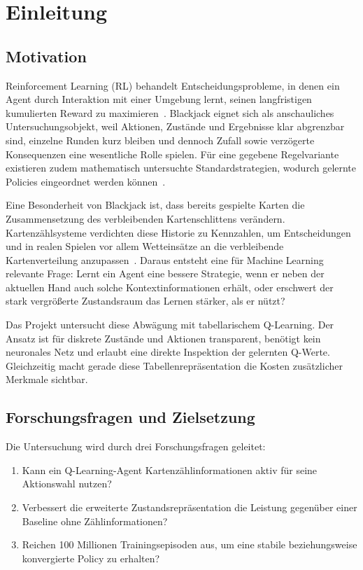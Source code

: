 \section{Einleitung}
\label{sec:einleitung}

\subsection{Motivation}

Reinforcement Learning (RL) behandelt Entscheidungsprobleme, in denen
ein Agent durch Interaktion mit einer Umgebung lernt, seinen
langfristigen kumulierten Reward zu
maximieren~\cite{sutton2018reinforcement}. Blackjack eignet sich als
anschauliches Untersuchungsobjekt, weil Aktionen, Zustände und
Ergebnisse klar abgrenzbar sind, einzelne Runden kurz bleiben und
dennoch Zufall sowie verzögerte Konsequenzen eine wesentliche Rolle
spielen. Für eine gegebene Regelvariante existieren zudem
mathematisch untersuchte Standardstrategien, wodurch gelernte
Policies eingeordnet werden können~\cite{baldwin1956blackjack}.

Eine Besonderheit von Blackjack ist, dass bereits gespielte Karten
die Zusammensetzung des verbleibenden Kartenschlittens verändern.
Kartenzählsysteme verdichten diese Historie zu Kennzahlen, um
Entscheidungen und in realen Spielen vor allem Wetteinsätze an die
verbleibende Kartenverteilung anzupassen~\cite{thorp1961favorable}.
Daraus entsteht eine für Machine Learning relevante Frage: Lernt ein
Agent eine bessere Strategie, wenn er neben der aktuellen Hand auch
solche Kontextinformationen erhält, oder erschwert der stark
vergrößerte Zustandsraum das Lernen stärker, als er nützt?

Das Projekt untersucht diese Abwägung mit tabellarischem Q-Learning.
Der Ansatz ist für diskrete Zustände und Aktionen transparent,
benötigt kein neuronales Netz und erlaubt eine direkte Inspektion der
gelernten Q-Werte. Gleichzeitig macht gerade diese
Tabellenrepräsentation die Kosten zusätzlicher Merkmale sichtbar.

\subsection{Forschungsfragen und Zielsetzung}

Die Untersuchung wird durch drei Forschungsfragen geleitet:

\begin{enumerate}
  \item Kann ein Q-Learning-Agent Kartenzählinformationen aktiv für
    seine Aktionswahl nutzen?
  \item Verbessert die erweiterte Zustandsrepräsentation die Leistung
    gegenüber einer Baseline ohne Zählinformationen?
  \item Reichen 100 Millionen Trainingsepisoden aus, um eine stabile
    beziehungsweise konvergierte Policy zu erhalten?
\end{enumerate}

